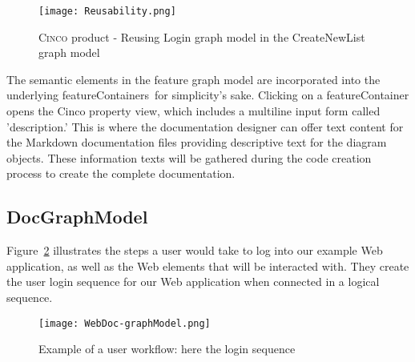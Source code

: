 \begin{figure}[h]
    \centering
    \texttt{[image: Reusability.png]}
    \caption{\textsc{Cinco} product - Reusing Login graph model in the CreateNewList graph model}
    \label{fig:reusability}
\end{figure}

The semantic elements in the feature graph model are incorporated into the underlying featureContainers for simplicity's sake. Clicking on a featureContainer opens the Cinco property view, which includes a multiline input form called 'description.' This is where the documentation designer can offer text content for the Markdown documentation files providing descriptive text for the diagram objects. These information texts will be gathered during the code creation process to create the complete documentation.

\subsection{DocGraphModel}\label{sec:DocGrahpModElem}

Figure~\ref{fig:loginSeq} illustrates the steps a user would take to log into our example Web application, as well as the Web elements that will be interacted with. They create the user login sequence for our Web application when connected in a logical sequence.

\begin{figure}[h]
    \centering
    \texttt{[image: WebDoc-graphModel.png]}
    \caption{Example of a user workflow: here the login sequence}
    \label{fig:loginSeq}
\end{figure}

